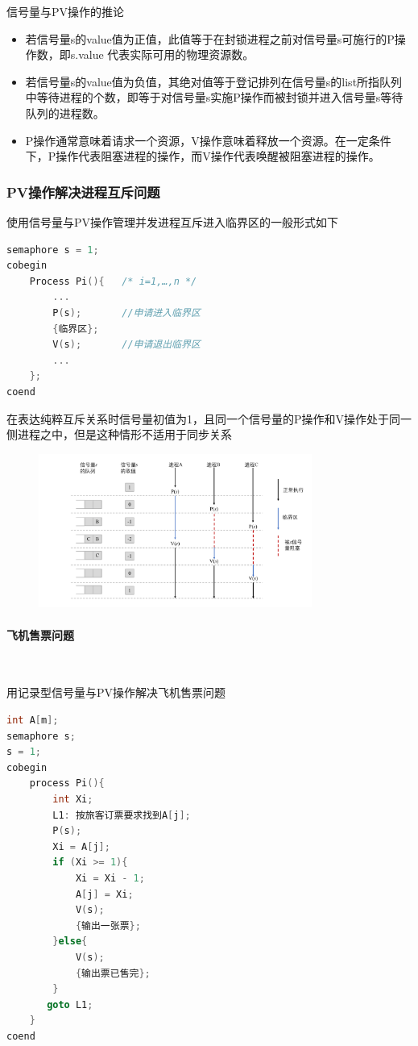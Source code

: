 \documentclass[cs4size,a4paper,10pt]{ctexart}
\begin{document}
	信号量与PV操作的推论
	\begin{itemize}
		\item 若信号量s的value值为正值，此值等于在封锁进程之前对信号量s可施行的P操作数，即s.value 代表实际可用的物理资源数。
		\item 若信号量s的value值为负值，其绝对值等于登记排列在信号量s的list所指队列中等待进程的个数，即等于对信号量s实施P操作而被封锁并进入信号量s等待队列的进程数。
		\item P操作通常意味着请求一个资源，V操作意味着释放一个资源。在一定条件下，P操作代表阻塞进程的操作，而V操作代表唤醒被阻塞进程的操作。
	\end{itemize}

	\subsubsection{PV操作解决进程互斥问题}
	使用信号量与PV操作管理并发进程互斥进入临界区的一般形式如下
	\begin{lstlisting}[language=C, keywordstyle=\color{black}]
semaphore s = 1;
cobegin
	Process Pi(){ 	/* i=1,…,n */
		...
		P(s); 		//申请进入临界区
		{临界区};
		V(s); 		//申请退出临界区
		...
	};
coend		
	\end{lstlisting}

	在表达纯粹互斥关系时信号量初值为1，且同一个信号量的P操作和V操作处于同一侧进程之中，但是这种情形不适用于同步关系

	\begin{figure}[H]
		\centering
		\includegraphics[width=0.8\textwidth]{img/信号量与PV操作控制并发进程之间的临界资源.pdf}
	\end{figure}

	\paragraph{飞机售票问题}~{}

	用记录型信号量与PV操作解决飞机售票问题
\begin{lstlisting}[language=C, keywordstyle=\color{black}]
int A[m];
semaphore s;
s = 1;
cobegin
	process Pi(){
		int Xi;
		L1: 按旅客订票要求找到A[j];
		P(s);
		Xi = A[j];
		if (Xi >= 1){
			Xi = Xi - 1;
			A[j] = Xi;
			V(s);
			{输出一张票};
		}else{
			V(s);
			{输出票已售完};
		}
	   goto L1;
	}
coend
\end{lstlisting}
\end{document}
